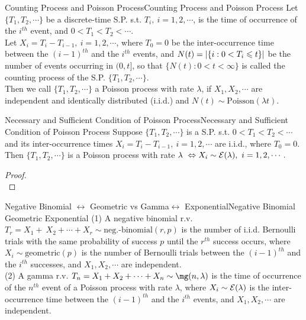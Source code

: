 \documentclass{elegantbook}
\begin{document}
\begin{definition}{Counting Process and Poisson Process}{Counting Process and Poisson Process}
Let $\{T_1,T_2,\cdots\}$ be a discrete-time S.P. s.t. $T_i,\ i=1,2,\cdots$, is the time of occurrence of the $i^{th}$ event, and $0<T_1<T_2<\cdots$.\\

Let $X_i=T_i-T_{i-1},\ i=1,2,\cdots$, where $T_0=0$ be the inter-occurrence time between the ${(i-1)}^{th}$ and the $i^{th}$ events, and $N(t)=|\{i:0<T_i\leqslant t\}|$ be the number of events occurring in $(0,t]$, so that $\{N(t):0<t<\infty\}$ is called the counting process of the S.P. $\{T_1,T_2,\cdots\}$.\\

Then we call $\{T_1,T_2,\cdots\}$ a Poisson process with rate $\lambda$, if $X_1,X_2,\cdots$ are independent and identically distributed (i.i.d.) and $N(t)\sim\mathrm{Poisson}(\lambda t)$.
\end{definition}

\begin{theorem}{Necessary and Suf\/f\/icient Condition of Poisson Process}{Necessary and Sufficient Condition of Poisson Process}
Suppose $\{T_1,T_2,\cdots\}$ is a S.P. s.t. $0<T_1<T_2<\cdots$ and its inter-occurrence times $X_i=T_i-T_{i-1},\ i=1,2,\cdots$ are i.i.d., where $T_0=0$. Then $\{T_1,T_2,\cdots\}$ is a Poisson process with rate $\lambda\ \Leftrightarrow X_i\sim\me(\lambda),\ i=1,2,\cdots.$
\end{theorem}

\begin{proof}
\\[4cm]\vspace{0.01cm}
\end{proof}

\begin{remark}{Negative Binomial $\leftrightarrow$ Geometric vs Gamma$ \leftrightarrow$ Exponential}{Negative Binomial Geometric Exponential}
(1) A negative binomial r.v. $T_r=X_1+\ X_2+\cdots+X_r\sim\text{neg.-binomial}(r,p)$ is the number of i.i.d. Bernoulli trials with the same probability of success $p$ until the $r^{th}$ success occurs, where $X_i\sim\mathrm{geometric}(p)$ is the number of Bernoulli trials between the ${(i-1)}^{th}$ and the $i^{th}$ successes, and $X_1,X_2,\cdots$ are independent.\\

(2) A gamma r.v. $T_n=X_1+X_2+\cdots+X_n\sim\mg(n,\lambda)$ is the time of occurrence of the $n^{th}$ event of a Poisson process with rate $\lambda$, where $X_i\sim\mathcal{E}(\lambda)$ is the inter-occurrence time between the ${(i-1)}^{th}$ and the $i^{th}$ events, and $X_1,X_2,\cdots$ are independent.
\end{remark}
\end{document}
